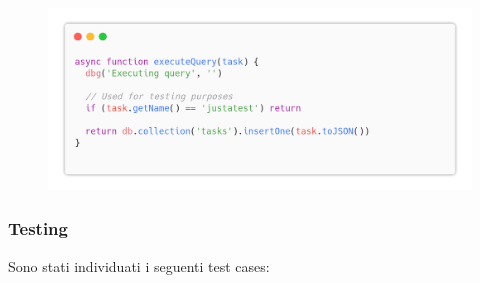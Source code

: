 \documentclass{report}
\begin{document}
\begin{figure}[H]
	\centering\includegraphics[width=1\textwidth]{images/code_crea_task4.png}
\end{figure}

\subsubsection*{Testing}
Sono stati individuati i seguenti test cases:
\end{document}
